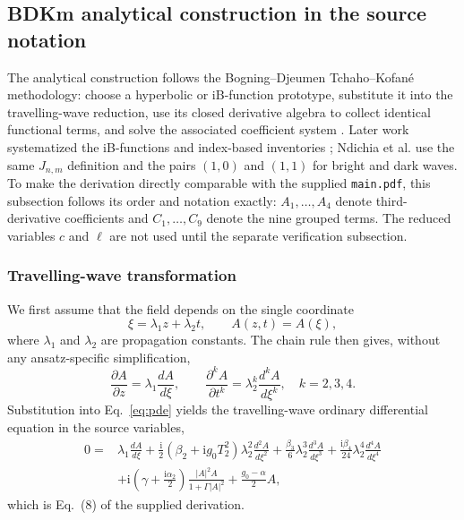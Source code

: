 \documentclass[11pt]{article}
\newcommand{\ii}{\mathrm{i}}
\begin{document}
\subsection{BDKm analytical construction in the source notation}
\label{sec:bdkm-derivation}

The analytical construction follows the Bogning--Djeumen Tchaho--Kofan\'e
methodology: choose a hyperbolic or iB-function prototype, substitute it into
the travelling-wave reduction, use its closed derivative algebra to collect
identical functional terms, and solve the associated coefficient system
\citep{djeumen2010,djeumen2011,bogning2012,bogning2012general}.  Later work
systematized the iB-functions and index-based inventories
\citep{bogning2019,bogning2021}; Ndichia et al. \citep{ndichia2026} use the
same $J_{n,m}$ definition and the pairs $(1,0)$ and $(1,1)$ for bright and dark
waves.  To make the derivation directly comparable with the supplied
\texttt{main.pdf}, this subsection follows its order and notation exactly:
$A_1,\ldots,A_4$ denote third-derivative coefficients and
$C_1,\ldots,C_9$ denote the nine grouped terms.  The reduced variables $c$ and
$\ell$ are not used until the separate verification subsection.

\subsubsection{Travelling-wave transformation}

We first assume that the field depends on the single coordinate
\begin{equation}
\xi=\lambda_1z+\lambda_2t,\qquad A(z,t)=A(\xi),
\label{eq:travelling-coordinate}
\end{equation}
where $\lambda_1$ and $\lambda_2$ are propagation constants.  The chain rule
then gives, without any ansatz-specific simplification,
\begin{equation}
\frac{\partial A}{\partial z}=\lambda_1\frac{dA}{d\xi},\qquad
\frac{\partial^kA}{\partial t^k}=\lambda_2^k\frac{d^kA}{d\xi^k},
\quad k=2,3,4.
\label{eq:chain-transform}
\end{equation}
Substitution into Eq.~\eqref{eq:pde} yields the travelling-wave ordinary
differential equation in the source variables,
\begin{align}
0={}&\lambda_1\frac{dA}{d\xi}
+\frac{\ii}{2}(\beta_2+\ii g_0T_2^2)\lambda_2^2\frac{d^2A}{d\xi^2}
+\frac{\beta_3}{6}\lambda_2^3\frac{d^3A}{d\xi^3}
+\frac{\ii\beta_4}{24}\lambda_2^4\frac{d^4A}{d\xi^4}\nonumber\\
&+\ii\left(\gamma+\frac{\ii\alpha_2}{2}\right)
\frac{|A|^2A}{1+\Gamma|A|^2}+\frac{g_0-\alpha}{2}A,
\label{eq:travelling-ode}
\end{align}
which is Eq.~(8) of the supplied derivation.
\end{document}
